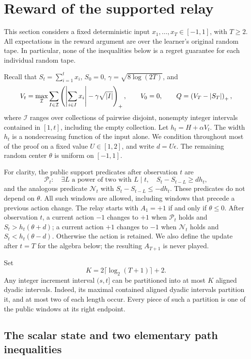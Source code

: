 \section{Reward of the supported relay}\label{sec:reward}

This section considers a fixed deterministic input
$x_1,\ldots,x_T\in[-1,1]$, with $T\ge2$. All expectations in the
reward argument are over the learner's original random tape. In particular,
none of the inequalities below is a regret guarantee for each individual
random tape.

Recall that $S_t=\sum_{i=1}^t x_i$, $S_0=0$,
$\gamma=\sqrt{8\log(2T)}$, and
\[
 V_t=\max_{\mathcal I}\sum_{I\in\mathcal I}
       \left(\left|\sum_{i\in I}x_i\right|-\gamma\sqrt{\left|I\right|}\right)_+,
 \qquad V_0=0,\qquad Q=\left(V_T-\left|S_T\right|\right)_+,
\]
where $\mathcal I$ ranges over collections of pairwise disjoint, nonempty
integer intervals contained in $[1,t]$, including the empty collection.
Let $h_t=H+\alpha V_t$. The width $h_t$ is a nondecreasing function of the
input alone. We condition throughout most of the proof on a fixed value
$U\in[1,2]$, and write $d=U\epsilon$. The remaining random center
$\theta$ is uniform on $[-1,1]$.

For clarity, the public support predicates after observation $t$ are
\[
 \mathcal P_t:\quad
 \exists L\text{ a power of two with }L\mid t,
 \quad S_t-S_{t-L}\ge d h_t,
\]
and the analogous predicate $\mathcal N_t$ with
$S_t-S_{t-L}\le-dh_t$. These predicates do not depend on $\theta$.
All such windows are allowed, including windows that precede a previous
action change. The relay starts with $A_1=+1$ if and only if $\theta\le0$.
After observation $t$, a current action $-1$ changes to $+1$ when
$\mathcal P_t$ holds and $S_t>h_t(\theta+d)$; a current action $+1$ changes
to $-1$ when $\mathcal N_t$ holds and $S_t<h_t(\theta-d)$.
Otherwise the action is retained. We also define the update after $t=T$
for the algebra below; the resulting $A_{T+1}$ is never played.

Set
\[
 K=2\lceil\log_2(T+1)\rceil+2.
\]
Any integer increment interval $(s,t]$ can be partitioned into at most
$K$ aligned dyadic intervals. Indeed, its maximal contained aligned dyadic
intervals partition it, and at most two of each length occur. Every piece
of such a partition is one of the public windows at its right endpoint.

\subsection{The scalar state and two elementary path inequalities}

